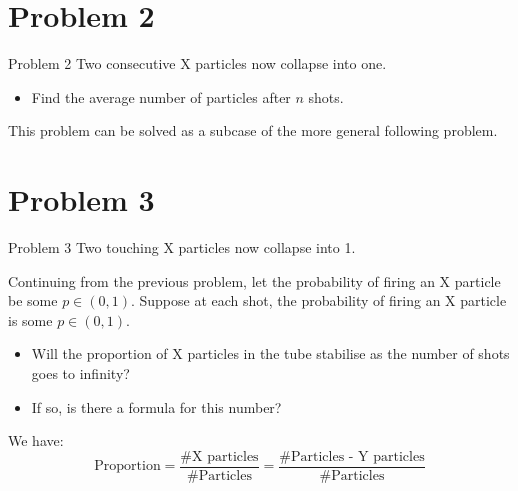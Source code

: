 \documentclass[xcolor={usenames,dvipsnames}]{beamer}
\begin{document}
\begin{comment}
  The formula represents the sum of each diagonal, which is made up of the sum of the previous two diagonals, satisfying the Fibonacci recursion. 

  Hence,   \[\sum_{k=0}^n \binom{n-k+1}{k} = F_{n+2}.\]
\end{multicols}

\end{frame}

\begin{frame}
  Since each of the $n$ particles is X or Y, the number of arrangements is $2^n$.

  Hence the probability that no two X-particles are consecutive after $n$ shots is \[
    \frac{F_{n+2}}{2^n}
  .\] 
\end{frame}
\end{comment}

\section{Problem 2}
\begin{frame}{Problem 2}
  Two consecutive X particles now collapse into one. 
  \begin{itemize}
    \item Find the average number of particles after $n$ shots.
  \end{itemize}

  This problem can be solved as a subcase of the more general following problem.
\end{frame}

\section{Problem 3}
\begin{frame}{Problem 3}
  Two touching X particles now collapse into 1.

  Continuing from the previous problem, let the probability of firing an X particle be some  $p \in (0, 1)$.
  Suppose at each shot, the probability of firing an X particle is  some $p \in (0, 1)$.
  \begin{itemize}
    \item Will the proportion of X particles in the tube stabilise as the number of shots goes to infinity?
    \item If so, is there a formula for this number?
  \end{itemize}
  We have:
  \begin{equation*}
    \text{Proportion} = \frac{\#\text{X particles}}{\#\text{Particles}} = \frac{\#\text{Particles - Y particles}}{\#\text{Particles}}
  \end{equation*}
\end{frame}
\end{document}
